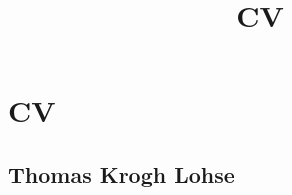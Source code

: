 \documentclass{article}
\title{\bfseries\Huge CV}
\date{}
\begin{document}
\section*{\Huge CV}
\subsection*{Thomas Krogh Lohse}
\iffalse
\begin{minipage}{0.76\textwidth}
        \large
    \begin{tabular}{ll}
        \toprule%

\end{tabular}
\end{minipage}
\end{document}
